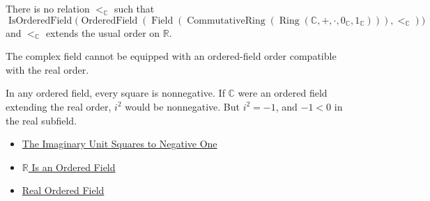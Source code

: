 \begin{remark*}
There is no relation $<_{\mathbb{C}}$ such that
\[
\operatorname{IsOrderedField}
\bigl(\operatorname{OrderedField}(
\operatorname{Field}(
\operatorname{CommutativeRing}(\operatorname{Ring}(
\mathbb{C},+,\cdot,0_{\mathbb{C}},1_{\mathbb{C}}))),
<_{\mathbb{C}})\bigr)
\]
and $<_{\mathbb{C}}$ extends the usual order on $\mathbb{R}$.
\end{remark*}

\begin{remark*}[Interpretation]
The complex field cannot be equipped with an ordered-field order compatible
with the real order.


In any ordered field,
every square is nonnegative. If \(\mathbb{C}\) were an
ordered field extending the real order, \(i^2\) would be nonnegative. But
\(i^2=-1\), and \(-1<0\) in the real subfield.
\end{remark*}

\begin{dependencies}
\begin{itemize}
  \item \hyperref[thm:i-squared-negative-one]{The Imaginary Unit Squares to Negative One}
  \item \hyperref[thm:r-is-an-ordered-field]{$\mathbb{R}$ Is an Ordered Field}
  \item \hyperref[def:real-ordered-field]{Real Ordered Field}
\end{itemize}
\end{dependencies}
